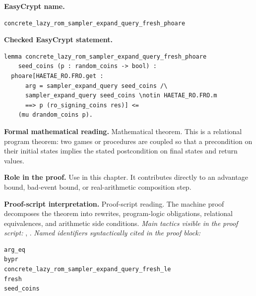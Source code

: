 \begin{formaltheorem}
\noindent\textbf{EasyCrypt name.}
\begin{lstlisting}[language=EasyCrypt,basicstyle=\ttfamily\scriptsize]
concrete_lazy_rom_sampler_expand_query_fresh_phoare
\end{lstlisting}
\noindent\textbf{Checked EasyCrypt statement.}
\begin{lstlisting}[language=EasyCrypt,basicstyle=\ttfamily\scriptsize]
lemma concrete_lazy_rom_sampler_expand_query_fresh_phoare
    seed_coins (p : random_coins -> bool) :
  phoare[HAETAE_RO.FRO.get :
      arg = sampler_expand_query seed_coins /\
      sampler_expand_query seed_coins \notin HAETAE_RO.FRO.m
      ==> p (ro_signing_coins res)] <=
    (mu drandom_coins p).
\end{lstlisting}
\noindent\textbf{Formal mathematical reading.}
Mathematical theorem. This is a relational program theorem: two games or procedures are coupled so that a precondition on their initial states implies the stated postcondition on final states and return values.

\noindent\textbf{Role in the proof.}
Use in this chapter. It contributes directly to an advantage bound, bad-event bound, or real-arithmetic composition step.

\noindent\textbf{Proof-script interpretation.}
Proof-script reading. The machine proof decomposes the theorem into rewrites, program-logic obligations, relational equivalences, and arithmetic side conditions.
\emph{Main tactics visible in the proof script:} \ec{rewrite}, \ec{apply}.
\emph{Named identifiers syntactically cited in the proof block:}
\begin{lstlisting}[language=EasyCrypt,basicstyle=\ttfamily\scriptsize]
arg_eq
bypr
concrete_lazy_rom_sampler_expand_query_fresh_le
fresh
seed_coins
\end{lstlisting}

\end{formaltheorem}

